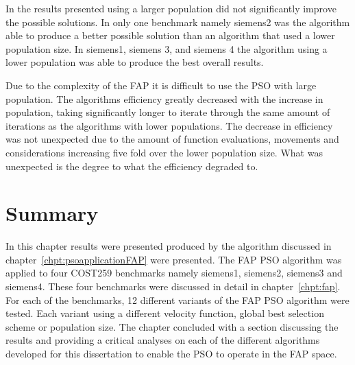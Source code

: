 In the results presented using a larger population did not significantly improve the possible solutions. In only one benchmark namely siemens2 was the algorithm able to produce a better possible solution than an algorithm that used a lower population size. In siemens1, siemens 3, and siemens 4 the algorithm using a lower population was able to produce the best overall results.

Due to the complexity of the FAP it is difficult to use the PSO with large population. The algorithms efficiency greatly decreased with the increase in population, taking significantly longer to iterate through the same amount of iterations as the algorithms with lower populations. The decrease in efficiency was not unexpected due to the amount of function evaluations, movements and considerations increasing five fold over the lower population size. What was unexpected is the degree to what the efficiency degraded to.
\section{Summary}
In this chapter results were presented produced by the algorithm discussed in chapter~\ref{chpt:psoapplicationFAP} were presented. The FAP PSO algorithm was applied to four COST259 benchmarks namely siemens1, siemens2, siemens3 and siemens4. These four benchmarks were discussed in detail in chapter~\ref{chpt:fap}. For each of the benchmarks, 12 different variants of the FAP PSO algorithm were tested. Each variant using a different velocity function, global best selection scheme or population size. The chapter concluded with a section discussing the results and providing a critical analyses on each of the different algorithms developed for this dissertation to enable the PSO to operate in the FAP space.
